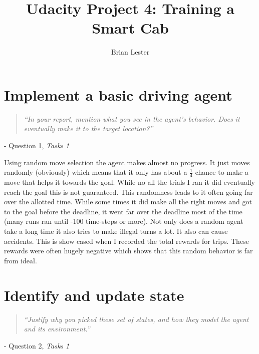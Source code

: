 \documentclass{article}
\title{Udacity Project 4: Training a Smart Cab}
\author{Brian Lester}
\newcommand{\chapquote}[3]
  {\begin{quotation} 
   \textit{#1} 
   \end{quotation} 
   \begin{flushright} - #2, 
   \textit{#3}
   \end{flushright} 
  }
\begin{document}
\maketitle
\section*{Implement a basic driving agent}
\chapquote{``In your report, mention what you see in the agent’s behavior. Does it eventually make it to the target location?''}{Question 1}{Tasks 1}

Using random move selection the agent makes almost no progress. It just moves randomly (obviously) which means that it only has about a $\frac{1}{4}$ chance to make a move that helps it towards the goal. While no all the trials I ran it did eventually reach the goal this is not guaranteed. This randomness leads to it often going far over the allotted time. While some times it did make all the right moves and got to the goal before the deadline, it went far over the deadline most of the time (many runs ran until -100 time-steps or more). Not only does a random agent take a long time it also tries to make illegal turns a lot. It also can cause accidents. This is show cased when I recorded the total rewards for trips. These rewards were often hugely negative which shows that this random behavior is far from ideal.

\section*{Identify and update state}
\chapquote{``Justify why you picked these set of states, and how they model the agent and its environment.''}{Question 2}{Tasks 1}
\end{document}
